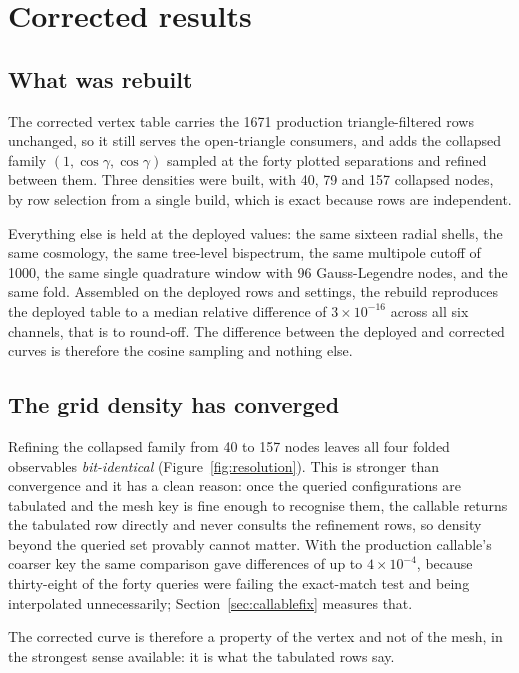 \section{Corrected results}
\label{sec:corrected}

\subsection{What was rebuilt}

The corrected vertex table carries the 1671 production triangle-filtered
rows unchanged, so it still serves the open-triangle consumers, and adds
the collapsed family $(1,\cos\gamma,\cos\gamma)$ sampled at the forty
plotted separations and refined between them. Three densities were built,
with 40, 79 and 157 collapsed nodes, by row selection from a single build,
which is exact because rows are independent.

Everything else is held at the deployed values: the same sixteen radial
shells, the same cosmology, the same tree-level bispectrum, the same
multipole cutoff of 1000, the same single quadrature window with 96
Gauss-Legendre nodes, and the same fold. Assembled on the deployed rows and
settings, the rebuild reproduces the deployed table to a median relative
difference of $3\times10^{-16}$ across all six channels, that is to
round-off. The difference between the deployed and corrected curves is
therefore the cosine sampling and nothing else.

\subsection{The grid density has converged}

Refining the collapsed family from 40 to 157 nodes leaves all four folded
observables \emph{bit-identical} (Figure~\ref{fig:resolution}). This is
stronger than convergence and it has a clean reason: once the queried
configurations are tabulated and the mesh key is fine enough to recognise
them, the callable returns the tabulated row directly and never consults
the refinement rows, so density beyond the queried set provably cannot
matter. With the production callable's coarser key the same comparison gave
differences of up to $4\times10^{-4}$, because thirty-eight of the forty
queries were failing the exact-match test and being interpolated
unnecessarily; Section~\ref{sec:callablefix} measures that.

The corrected curve is therefore a property of the vertex and not of the
mesh, in the strongest sense available: it is what the tabulated rows say.

